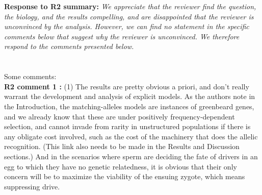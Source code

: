 \documentclass[12pt,letterpaper]{article}
\newcommand{\gc}[1]{{ \color{red} #1}}
\begin{document}
{\bf{Response to R2 summary:}} \emph{We appreciate that \gc{the reviewer} find the question, the biology, and the results compelling, and are disappointed that the \gc{reviewer is} unconvinced by the analysis. However, we can find no statement in \gc{the specific comments below that suggest why the reviewer is unconvinced}. We therefore respond to the comments \gc{presented below}.}
\\
\\
\\
Some comments:
\\
{\bf{R2 comment 1 :}}
(1) The results are pretty obvious a priori, and don't really warrant the development and analysis of explicit models. As the authors note in the Introduction, the matching-alleles models are instances of greenbeard genes, and we already know that these are under positively frequency-dependent selection, and cannot invade from rarity in unstructured populations if there is any obligate cost involved, such as the cost of the machinery that does the allelic recognition. (This link also needs to be made in the Results and Discussion sections.) And in the scenarios where sperm are deciding the fate of drivers in an egg to which they have no genetic relatedness, it is obvious that their only concern will be to maximize the viability of the ensuing zygote, which means suppressing drive.
\end{document}

